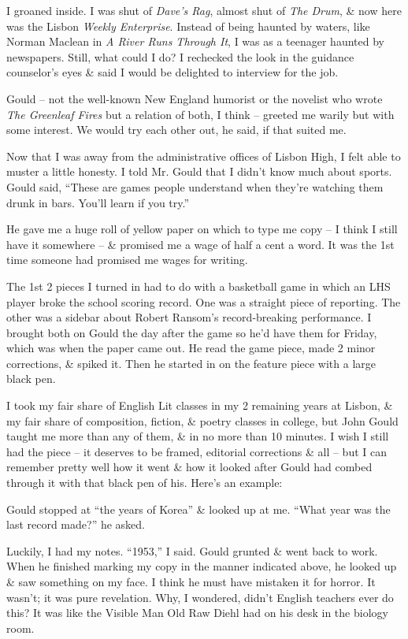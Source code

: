 \documentclass{article}
\numberwithin{equation}{section}
\begin{document}
I groaned inside. I was shut of \textit{Dave's Rag}, almost shut of \textit{The Drum}, \& now here was the Lisbon \textit{Weekly Enterprise}. Instead of being haunted by waters, like Norman Maclean in \textit{A River Runs Through It}, I was as a teenager haunted by newspapers. Still, what could I do? I rechecked the look in the guidance counselor's eyes \& said I would be delighted to interview for the job.

Gould -- not the well-known New England humorist or the novelist who wrote \textit{The Greenleaf Fires} but a relation of both, I think -- greeted me warily but with some interest. We would try each other out, he said, if that suited me.

Now that I was away from the administrative offices of Lisbon High, I felt able to muster a little honesty. I told Mr. Gould that I didn't know much about sports. Gould said, ``These are games people understand when they're watching them drunk in bars. You'll learn if you try.''

He gave me a huge roll of yellow paper on which to type me copy -- I think I still have it somewhere -- \& promised me a wage of half a cent a word. It was the 1st time someone had promised me wages for writing.

The 1st 2 pieces I turned in had to do with a basketball game in which an LHS player broke the school scoring record. One was a straight piece of reporting. The other was a sidebar about Robert Ransom's record-breaking performance. I brought both on Gould the day after the game so he'd have them for Friday, which was when the paper came out. He read the game piece, made 2 minor corrections, \& spiked it. Then he started in on the feature piece with a large black pen.

I took my fair share of English Lit classes in my 2 remaining years at Lisbon, \& my fair share of composition, fiction, \& poetry classes in college, but John Gould taught me more than any of them, \& in no more than 10 minutes. I wish I still had the piece -- it deserves to be framed, editorial corrections \& all -- but I can remember pretty well how it went \& how it looked after Gould had combed through it with that black pen of his. Here's an example: {\sf[excerpt]}

Gould stopped at ``the years of Korea'' \& looked up at me. ``What year was the last record made?'' he asked.

Luckily, I had my notes. ``1953,'' I said. Gould grunted \& went back to work. When he finished marking my copy in the manner indicated above, he looked up \& saw something on my face. I think he must have mistaken it for horror. It wasn't; it was pure revelation. Why, I wondered, didn't English teachers ever do this? It was like the Visible Man Old Raw Diehl had on his desk in the biology room.
\end{document}
